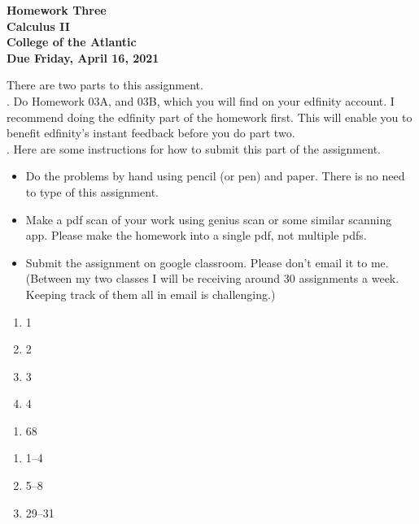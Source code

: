 \documentclass[12pt]{article}
\begin{document}
\pagestyle{empty}
 
\begin{center}
{\LARGE {\bf Homework Three}}\\
\bigskip
{\Large {\bf Calculus II}}\\
\bigskip
{\Large {\bf College of the Atlantic}}\\
\bigskip
{ {\bf Due Friday, April 16, 2021}}\\ 
\end{center}
\medskip


\noindent There are two parts to this assignment.\\

.  Do Homework 03A, and 03B,
which you will find on your edfinity account.  I recommend doing the
edfinity part of the homework first.  This will enable you to benefit
edfinity's instant feedback before you do part two.\\

.  Here are some
instructions for how to submit this part of the assignment.
\begin{itemize}
\item Do the problems by hand using pencil (or pen) and paper.
  There is no need to type of this assignment.
\item Make a pdf scan of your work using genius scan or some
  similar scanning app.  Please make the homework into a single
  pdf, not multiple pdfs.
\item Submit the assignment on google classroom.  Please don't
  email it to me.  (Between my two classes I will be receiving
  around 30 assignments a week.  Keeping track of them all in email
  is challenging.)
\end{itemize}


\begin{enumerate}
\setlength{\itemsep}{-1mm}
\item 1
\item 2
\item 3
\item 4
\end{enumerate}



\begin{enumerate}
\setlength{\itemsep}{-1mm}
\item 68
\end{enumerate}



\begin{enumerate}
\setlength{\itemsep}{-1mm}
\item 1--4
\item 5--8
\item 29--31  
\end{enumerate}
\end{document}

